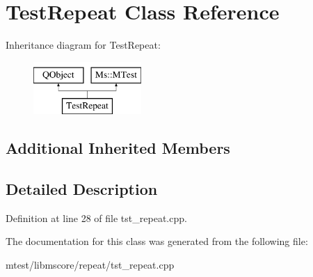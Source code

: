 \hypertarget{class_test_repeat}{}\section{Test\+Repeat Class Reference}
\label{class_test_repeat}
Inheritance diagram for Test\+Repeat\+:\begin{figure}[H]
\begin{center}
\leavevmode
\includegraphics[height=2.000000cm]{class_test_repeat}
\end{center}
\end{figure}
\subsection*{Additional Inherited Members}


\subsection{Detailed Description}


Definition at line 28 of file tst\+\_\+repeat.\+cpp.



The documentation for this class was generated from the following file\+:\begin{DoxyCompactItemize}
\item 
mtest/libmscore/repeat/tst\+\_\+repeat.\+cpp\end{DoxyCompactItemize}
